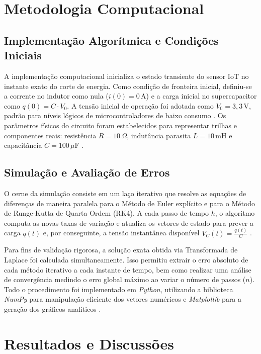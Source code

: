 \documentclass[12pt, a4paper]{article}
\begin{document}
\section{Metodologia Computacional}

\subsection{Implementação Algorítmica e Condições Iniciais}
A implementação computacional inicializa o estado transiente do sensor IoT no instante exato do corte de energia. Como condição de fronteira inicial, definiu-se a corrente no indutor como nula ($i(0) = 0\,\text{A}$) e a carga inicial no supercapacitor como $q(0) = C \cdot V_0$. A tensão inicial de operação foi adotada como $V_0 = 3{,}3\,\text{V}$, padrão para níveis lógicos de microcontroladores de baixo consumo \cite{igwe2025}. Os parâmetros físicos do circuito foram estabelecidos para representar trilhas e componentes reais: resistência $R = 10\,\Omega$, indutância parasita $L = 10\,\text{mH}$ e capacitância $C = 100\,\mu\text{F}$ \cite{shaikh2022}.

\subsection{Simulação e Avaliação de Erros}
O cerne da simulação consiste em um laço iterativo que resolve as equações de diferenças de maneira paralela para o Método de Euler explícito e para o Método de Runge-Kutta de Quarta Ordem (RK4). A cada passo de tempo $h$, o algoritmo computa as novas taxas de variação e atualiza os vetores de estado para prever a carga $q(t)$ e, por conseguinte, a tensão instantânea disponível $V_C(t) = \frac{q(t)}{C}$ \cite{aselebe2026}.

Para fins de validação rigorosa, a solução exata obtida via Transformada de Laplace foi calculada simultaneamente. Isso permitiu extrair o erro absoluto de cada método iterativo a cada instante de tempo, bem como realizar uma análise de convergência medindo o erro global máximo ao variar o número de passos ($n$). Todo o procedimento foi implementado em \textit{Python}, utilizando a biblioteca \textit{NumPy} para manipulação eficiente dos vetores numéricos e \textit{Matplotlib} para a geração dos gráficos analíticos \cite{igwe2025}.


\section{Resultados e Discussões}
\end{document}
